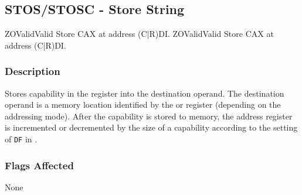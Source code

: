 \clearpage
{}
{}
\subsection*{STOS/STOSC - Store String}

\begin{x86opcodetable}
  {ZO}{Valid}{Valid}
  {Store CAX at address (C|R)DI.}
  {ZO}{Valid}{Valid}
  {Store CAX at address (C|R)DI.}
\end{x86opcodetable}

\begin{x86opentable}
\end{x86opentable}

\subsubsection*{Description}

Stores capability in the \CAX{} register into the destination operand.
The destination operand is a memory location identified by the \RDI{}
or \CDI{} register (depending on the addressing mode).  After the
capability is stored to memory, the address register is incremented or
decremented by the size of a capability according to the setting of
\texttt{DF} in \RFLAGS{}.

\subsubsection*{Flags Affected}

None
